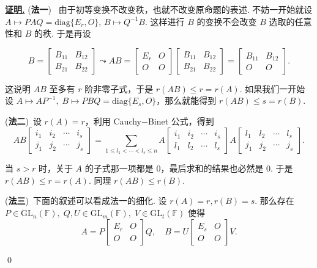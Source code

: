 \documentclass[10pt,openany]{article}
\theoremstyle{thmstyle} %
\theoremstyle{defstyle} %
\theoremstyle{prostyle} %
\theoremstyle{exastyle}
\theoremstyle{remstyle}
\renewenvironment{proof}[1][证明]{\par\underline{\textbf{#1.}} \;\fangsong}{\qed\par}
\newcommand{\F}{\mathbb{F}}
\newcommand{\gfn}{\text{GL}_n(\mathbb{F})}
\newcommand{\gfm}{\text{GL}_m(\mathbb{F})}
\newcommand{\diag}{\mathrm{diag}}
\begin{document}
\begin{proof}
	(\textbf{法一}) \ 由于初等变换不改变秩，也就不改变原命题的表述. 不妨一开始就设 \( A \mapsto PAQ= \diag\{E_r,O\} \), \( B \mapsto Q^{-1}B \). 这样进行 \( B \) 的变换不会改变 \( B \) 选取的任意性和 \( B \) 的秩. 于是再设
	
	\[
	B =\begin{bmatrix}
		B_{11} & B_{12} \\
		B_{21} & B_{22}
	\end{bmatrix} \leadsto AB =\begin{bmatrix}
		E_r & O \\
		O   & O
	\end{bmatrix}\begin{bmatrix}
		B_{11} & B_{12} \\
		B_{21} & B_{22}
	\end{bmatrix}=\begin{bmatrix}
		B_{11} & B_{12} \\
		O      & O
	\end{bmatrix}.
	\]
	
	这说明 \( AB \) 至多有 \( r \) 阶非零子式，于是 \( r(AB) \leq r=r(A) \). 如果我们一开始设 \( A \mapsto AP^{-1}, \; B \mapsto PBQ=\diag\{E_s,O\} \)，那么就能得到 \( r(AB) \leq s=r(B) \).
	
	\vspace{1ex}
	
	(\textbf{法二})\ 设 \( r(A)=r \)，利用 Cauchy\(-\)Binet 公式，得到
	\[ AB\begin{bmatrix}
		i_1 & i_2 & \cdots & i_s \\
		j_1 & j_2 & \cdots & j_s
	\end{bmatrix}= \sum_{1 \leq l_1 < \cdots < l_s \leq n}^{} A\begin{bmatrix}
	i_1 & i_2 & \cdots & i_s \\
	l_1 & l_2 & \cdots & l_s
	\end{bmatrix} A\begin{bmatrix}
	l_1 & l_2 & \cdots & l_s\\
	j_1 & j_2 & \cdots & j_s
	\end{bmatrix}. \]
	
	当 \( s>r \) 时，关于 \( A \) 的子式那一项都是 0，最后求和的结果也必然是 0. 于是 \( r(AB) \leq r=r(A) \). 同理 \( r(AB) \leq r(B) \). 
	
	\vspace{1ex}
	
	(\textbf{法三})\ 下面的叙述可以看成法一的细化. 设 \( r(A)=r, r(B)=s \). 那么存在 \( P \in \gfn, \; Q, U \in \gfm, \; V \in \text{GL}_t(\F) \) 使得
	\[
	A = P
	\begin{bmatrix}
		E_r & O \\
		O   & O
	\end{bmatrix}
	Q, 
	\quad 
	B = U
	\begin{bmatrix}
		E_s & O \\
		O   & O
	\end{bmatrix}
	V.
	\]
	

\end{proof}
\end{document}
